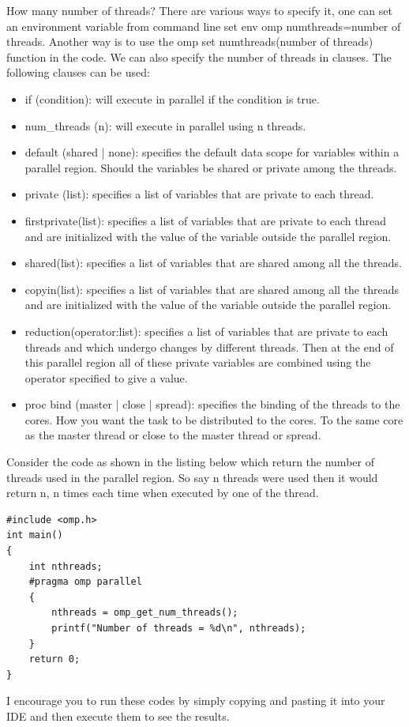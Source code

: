 \documentclass[12pt]{book}
\begin{document}
How many number of threads? There are various ways to specify it, one can set an environment variable from command line set env omp numthreads=number of threads. 
Another way is to use the omp set numthreads(number of threads) function in the code. We can also specify the number of threads in clauses.
The following clauses can be used:
\begin{itemize}
\item if (condition): will execute in parallel if the condition is true.
\item num\_threads (n): will execute in parallel using n threads.
\item default (shared | none): specifies the default data scope for variables within a parallel region. Should the variables be shared or private among the threads.
\item private (list): specifies a list of variables that are private to each thread.
\item firstprivate(list): specifies a list of variables that are private to each thread and are initialized with the value of the variable outside the parallel region.
\item shared(list): specifies a list of variables that are shared among all the threads.
\item copyin(list): specifies a list of variables that are shared among all the threads and are initialized with the value of the variable outside the parallel region.
\item reduction(operator:list): specifies a list of variables that are private to each threads and which undergo changes by different threads. Then at the end of this parallel region all of these private variables are combined using the operator 
specified to give a value.
\item proc bind (master | close | spread): specifies the binding of the threads to the cores. How you want the task to be distributed to the cores. To the same core as the master thread or close to the master thread or spread.
\end{itemize}
Consider the code as shown  in the listing below which return the number of threads used in the parallel region. So say n threads were used then it would return n, n times each time when executed by one of the thread. 
\begin{lstlisting}
#include <omp.h>
int main()
{
    int nthreads;
    #pragma omp parallel
    {
        nthreads = omp_get_num_threads();
        printf("Number of threads = %d\n", nthreads);
    }
    return 0;
}
\end{lstlisting}
I encourage you to run these codes by simply copying and pasting it into your IDE and then execute them to see the results.
\end{document}

